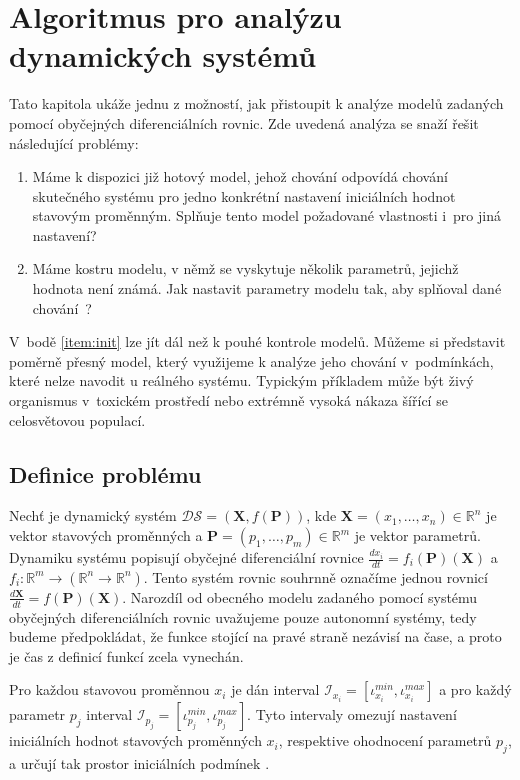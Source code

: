 \chapter{Algoritmus pro analýzu dynamických systémů}\label{chapter:algorithm}

Tato kapitola ukáže jednu z možností, jak přistoupit k analýze modelů zadaných
pomocí obyčejných diferenciálních rovnic. Zde uvedená analýza se snaží řešit následující
problémy:
\begin{enumerate}
	\item\label{item:init}	Máme k dispozici již hotový model, jehož chování odpovídá chování skutečného
			systému pro jedno konkrétní nastavení iniciálních hodnot stavovým
			proměnným. Splňuje tento model požadované vlastnosti i~pro jiná nastavení?
	\item	Máme kostru modelu, v němž se vyskytuje několik parametrů, jejichž hodnota
			není známá. Jak nastavit parametry modelu tak, aby splňoval dané chování~\cite{aster2012}?
\end{enumerate}

V~bodě \ref{item:init} lze jít dál než k pouhé kontrole modelů. Můžeme si představit
poměrně přesný model, který využijeme k analýze jeho chování v~pod\-mín\-kách, které nelze
navodit u reálného systému. Typickým příkladem může být živý organismus v~toxickém
prostředí nebo extrémně vysoká nákaza šířící se ce\-lo\-svě\-to\-vou populací.

\section{Definice problému}\label{section:initial:condtion:problem:definition}

Nechť je dynamický systém $\mathcal{DS} = (\mathbf{X}, f(\mathbf{P}))$, kde $\mathbf{X} = (x_1, \ldots, x_n) \in \mathbb{R}^n$
je vektor stavových proměnných a $\mathbf{P}  = (p_1, \ldots, p_m) \in \mathbb{R}^m$ je vektor parametrů. Dynamiku systému popisují obyčejné diferenciální
rovnice $\frac{dx_i}{dt} = f_i(\mathbf{P})(\mathbf{X})$ a $f_i: \mathbb{R}^m \rightarrow (\mathbb{R}^n \rightarrow \mathbb{R}^n)$.
Tento systém rovnic souhrnně označíme jednou rovnicí $\frac{d\mathbf{X}}{dt} = f(\mathbf{P})(\mathbf{X})$. Narozdíl
od obecného modelu zadaného pomocí systému obyčejných diferenciálních rovnic uvažujeme pouze autonomní systémy,
tedy budeme předpokládat, že funkce stojící na pravé straně ne\-zá\-vi\-sí na čase, a proto je čas z definicí funkcí zcela vynechán.

Pro každou stavovou proměnnou $x_i$ je dán interval $\mathcal{I}_{x_i} = [\iota_{x_i}^{min}, \iota_{x_i}^{max}]$
a pro každý parametr $p_j$ interval $\mathcal{I}_{p_j} = [\iota_{p_j}^{min}, \iota_{p_j}^{max}]$.
Tyto intervaly omezují nastavení iniciálních hodnot stavových proměnných $x_i$, respektive o\-hod\-no\-ce\-ní
parametrů $p_j$, a určují tak prostor iniciálních podmínek \cite[str. 23]{drazan2011}.

